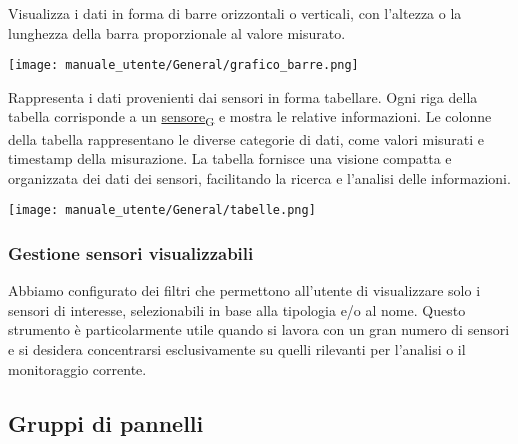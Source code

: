 Visualizza i dati in forma di barre orizzontali o verticali, con l'altezza o la lunghezza della barra proporzionale al valore misurato. 
\begin{center}
    \texttt{[image: manuale\_utente/General/grafico\_barre.png]}
\end{center}

Rappresenta i dati provenienti dai sensori in forma tabellare. Ogni riga della tabella corrisponde a un \href{https://7last.github.io/docs/pb/documentazione-interna/glossario\#sensore}{sensore\textsubscript{G}} e mostra le relative informazioni. Le colonne della tabella rappresentano le diverse categorie di dati, come valori misurati e timestamp della misurazione. La tabella fornisce una visione compatta e organizzata dei dati dei sensori, facilitando la ricerca e l'analisi delle informazioni.
\begin{center}
    \texttt{[image: manuale\_utente/General/tabelle.png]}
\end{center} 


\subsubsection{Gestione sensori visualizzabili}
Abbiamo configurato dei filtri che permettono all'utente di visualizzare solo i sensori di interesse, selezionabili in base alla tipologia e/o al nome. Questo strumento è particolarmente utile quando si lavora con un gran numero di sensori e si desidera concentrarsi esclusivamente su quelli rilevanti per l'analisi o il monitoraggio corrente.
\newpage
\subsection{Gruppi di pannelli}
